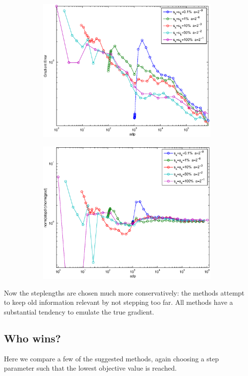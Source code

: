 \documentclass[12pt]{article}
\begin{document}
\begin{figure}[H]
\begin{subfigure}[b]{.5\linewidth}
	        \includegraphics[width=4in]{Figures/exp2-3.eps}
\end{subfigure}%
\begin{subfigure}[b]{.5\linewidth}
	        \includegraphics[width=4in]{Figures/exp2-4.eps}
\end{subfigure}%
\end{figure}
	
	Now the steplengths are chosen much more conservatively: the methods attempt to keep old information relevant by not stepping too far. All methods have a substantial tendency to emulate the true gradient.
	
	\newpage
	
	\subsection{Who wins?}
	
	Here we compare a few of the suggested methods, again choosing a step parameter such that the lowest objective value is reached. 
	
\end{document}
